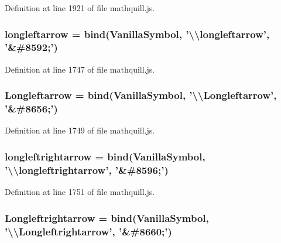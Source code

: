 Definition at line 1921 of file mathquill.\-js.

\subsubsection[{longleftarrow}]{ longleftarrow = {\bf bind}({\bf Vanilla\-Symbol}, '\textbackslash{}\textbackslash{}longleftarrow', '\&\#8592;')}\label{mathquill_8js_ab0c4a374c370242fac23a8c366042026}


Definition at line 1747 of file mathquill.\-js.

\subsubsection[{Longleftarrow}]{ Longleftarrow = {\bf bind}({\bf Vanilla\-Symbol}, '\textbackslash{}\textbackslash{}Longleftarrow', '\&\#8656;')}\label{mathquill_8js_aa7cafa3db4bdc564baf783bbb9e73fe0}


Definition at line 1749 of file mathquill.\-js.

\subsubsection[{longleftrightarrow}]{ longleftrightarrow = {\bf bind}({\bf Vanilla\-Symbol}, '\textbackslash{}\textbackslash{}longleftrightarrow', '\&\#8596;')}\label{mathquill_8js_a5fe0a45b88bc37fbe7c7b38495472e64}


Definition at line 1751 of file mathquill.\-js.

\subsubsection[{Longleftrightarrow}]{ Longleftrightarrow = {\bf bind}({\bf Vanilla\-Symbol}, '\textbackslash{}\textbackslash{}Longleftrightarrow', '\&\#8660;')}\label{mathquill_8js_acf790a4b2516b29cf0774b1501d4e4b1}


